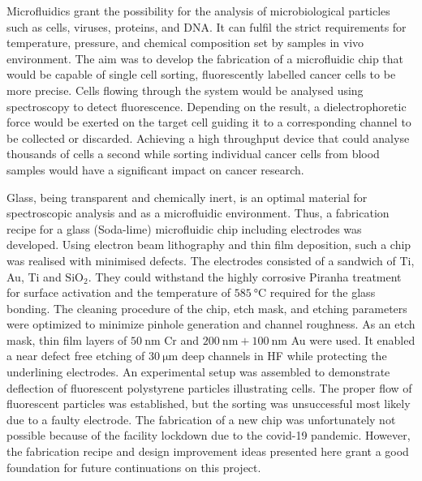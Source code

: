 \documentclass[final]{jyflluk}
\begin{document}
\bigskip
{

\noindent Microfluidics grant the possibility for the analysis of microbiological particles such as cells, viruses, proteins, and DNA. It can fulfil the strict requirements for temperature, pressure, and chemical composition set by samples in vivo environment. The aim was to develop the fabrication of a microfluidic chip that would be capable of single cell sorting, fluorescently labelled cancer cells to be more precise. Cells flowing through the system would be analysed using spectroscopy to detect fluorescence. Depending on the result, a dielectrophoretic force would be exerted on the target cell guiding it to a corresponding channel to be collected or discarded. Achieving a high throughput device that could analyse thousands of cells a second while sorting individual cancer cells from blood samples would have a significant impact on cancer research.

Glass, being transparent and chemically inert, is an optimal material for spectroscopic analysis and as a microfluidic environment. Thus, a fabrication recipe for a glass (Soda-lime) microfluidic chip including electrodes was developed. Using electron beam lithography and thin film deposition, such a chip was realised with minimised defects. The electrodes consisted of a sandwich of Ti, Au, Ti and $\mathrm{SiO_2}$. They could withstand the highly corrosive Piranha treatment for surface activation and the temperature of $\SI{585}{\celsius}$ required for the glass bonding. The cleaning procedure of the chip, etch mask, and etching parameters were optimized to minimize pinhole generation and channel roughness. As an etch mask, thin film layers of $\SI{50}{\nano \metre}$ Cr and  $\SI{200}{\nano \metre} + \SI{100}{\nano \metre}$ Au were used. It enabled a near defect free etching of $\SI{30}{\micro \metre}$ deep channels in HF while protecting the underlining electrodes. An experimental setup was assembled to demonstrate deflection of fluorescent polystyrene particles illustrating cells. The proper flow of fluorescent particles was established, but the sorting was unsuccessful most likely due to a faulty electrode. The fabrication of a new chip was unfortunately not possible because of the facility lockdown due to the covid-19 pandemic. However, the fabrication recipe and design improvement ideas presented here grant a good foundation for future continuations on this project.

}


\bigskip
\end{document}
